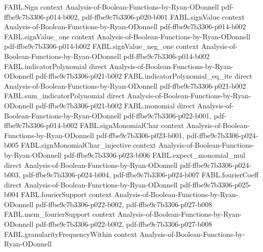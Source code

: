 \begin{theorem}
\label{FABL.noiseOperator_middleLayerIndicator_allOne_eq_fourierSum}
\leanok
{}
\proofstep
  {FABL.Sign}
  {context}
  {Analysis-of-Boolean-Functions-by-Ryan-ODonnell}
  {pdf-ffbe9c7b3306-p014-b002,
    pdf-ffbe9c7b3306-p020-b001}
\proofstep
  {FABL.signValue}
  {context}
  {Analysis-of-Boolean-Functions-by-Ryan-ODonnell}
  {pdf-ffbe9c7b3306-p014-b002}
\proofstep
  {FABL.signValue_one}
  {context}
  {Analysis-of-Boolean-Functions-by-Ryan-ODonnell}
  {pdf-ffbe9c7b3306-p014-b002}
\proofstep
  {FABL.signValue_neg_one}
  {context}
  {Analysis-of-Boolean-Functions-by-Ryan-ODonnell}
  {pdf-ffbe9c7b3306-p014-b002}
\proofstep
  {FABL.indicatorPolynomial}
  {direct}
  {Analysis-of-Boolean-Functions-by-Ryan-ODonnell}
  {pdf-ffbe9c7b3306-p021-b002}
\proofstep
  {FABL.indicatorPolynomial_eq_ite}
  {direct}
  {Analysis-of-Boolean-Functions-by-Ryan-ODonnell}
  {pdf-ffbe9c7b3306-p021-b002}
\proofstep
  {FABL.sum_indicatorPolynomial}
  {direct}
  {Analysis-of-Boolean-Functions-by-Ryan-ODonnell}
  {pdf-ffbe9c7b3306-p021-b002}
\proofstep
  {FABL.monomial}
  {direct}
  {Analysis-of-Boolean-Functions-by-Ryan-ODonnell}
  {pdf-ffbe9c7b3306-p022-b001,
    pdf-ffbe9c7b3306-p014-b002}
\proofstep
  {FABL.signMonomialChar}
  {context}
  {Analysis-of-Boolean-Functions-by-Ryan-ODonnell}
  {pdf-ffbe9c7b3306-p023-b001,
    pdf-ffbe9c7b3306-p024-b005}
\proofstep
  {FABL.signMonomialChar_injective}
  {context}
  {Analysis-of-Boolean-Functions-by-Ryan-ODonnell}
  {pdf-ffbe9c7b3306-p023-b006}
\proofstep
  {FABL.expect_monomial_mul}
  {direct}
  {Analysis-of-Boolean-Functions-by-Ryan-ODonnell}
  {pdf-ffbe9c7b3306-p024-b003,
    pdf-ffbe9c7b3306-p024-b004,
    pdf-ffbe9c7b3306-p024-b007}
\proofstep
  {FABL.fourierCoeff}
  {direct}
  {Analysis-of-Boolean-Functions-by-Ryan-ODonnell}
  {pdf-ffbe9c7b3306-p025-b004}
\proofstep
  {FABL.fourierSupport}
  {context}
  {Analysis-of-Boolean-Functions-by-Ryan-ODonnell}
  {pdf-ffbe9c7b3306-p022-b002,
    pdf-ffbe9c7b3306-p027-b008}
\proofstep
  {FABL.mem_fourierSupport}
  {context}
  {Analysis-of-Boolean-Functions-by-Ryan-ODonnell}
  {pdf-ffbe9c7b3306-p022-b002,
    pdf-ffbe9c7b3306-p027-b008}
\proofstep
  {FABL.granularityFrequencyWithin}
  {context}
  {Analysis-of-Boolean-Functions-by-Ryan-ODonnell}

\end{theorem}

